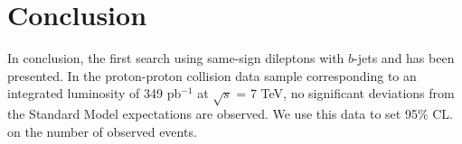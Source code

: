 \section{Conclusion}
\label{sec:conclusion}
In conclusion, the first search using same-sign dileptons with $b$-jets and \met has been presented. In the
proton-proton collision data sample corresponding to an integrated luminosity of 349 pb$^{-1}$ at $\sqrt{s}$ = 7 TeV,
no significant deviations from the Standard Model expectations are observed. We use this data to set 95\% CL. on the
number of observed events.
